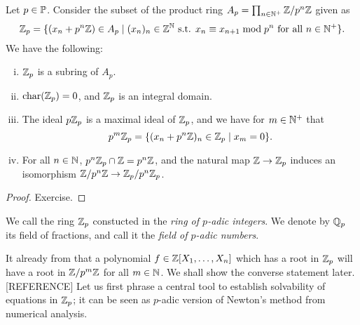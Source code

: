 \documentclass[12pt, leqno, british]{amsart}
\begin{document}
\begin{prop}\label{P:Zp-construction}
Let $p \in \mathbb P$. Consider the subset of the product ring $A_p = \prod_{n \in \mathbb N^+} \mathbb Z/p^n \mathbb Z$ given as
$$ \mathbb Z_p = \lbrace (x_n + p^n\mathbb Z) \in A_p \mid (x_n)_n \in \mathbb Z^\mathbb N \text{ s.t. } x_n \equiv x_{n+1} \bmod p^n \text{ for all } n \in \mathbb N^+ \rbrace.$$
We have the following:
\begin{enumerate}[(i)]
\item $\mathbb Z_p$ is a subring of $A_p$.
\item $\operatorname{char}(\mathbb Z_p) = 0$, and $\mathbb Z_p$ is an integral domain.
\item The ideal $p\mathbb Z_p$ is a maximal ideal of $\mathbb Z_p$, and we have for $m \in \mathbb N^+$ that
$$ p^m\mathbb Z_p = \lbrace (x_n + p^n\mathbb Z)_n \in \mathbb Z_p \mid x_m = 0 \rbrace.$$
\item For all $n \in \mathbb N$, $p^n\mathbb Z_p \cap \mathbb Z = p^n\mathbb Z$, and the natural map $\mathbb Z \to \mathbb Z_p$ induces an isomorphism $\mathbb Z/p^n\mathbb Z \to \mathbb Z_p/p^n\mathbb Z_p$.
\end{enumerate}
\end{prop}
\begin{proof}
Exercise.
\end{proof}
\begin{defi}
We call the ring $\mathbb Z_p$ constucted in  the \emph{ring of $p$-adic integers}.
We denote by $\mathbb Q_p$ its field of fractions, and call it the \emph{field of $p$-adic numbers}.
\end{defi}
It already from  that a polynomial $f \in \mathbb Z[X_1, \ldots, X_n]$ which has a root in $\mathbb Z_p$ will have a root in $\mathbb Z/p^m\mathbb Z$ for all $m \in \mathbb N$.
We shall show the converse statement later. [REFERENCE]
Let us first phrase a central tool to establish solvability of equations in $\mathbb Z_p$; it can be seen as $p$-adic version of Newton's method from numerical analysis.
\end{document}
